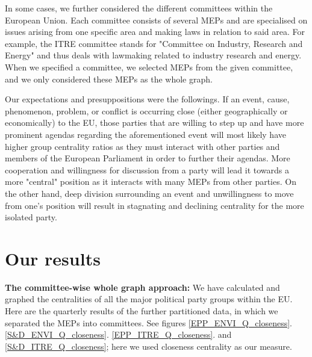\documentclass[lettersize,journal]{IEEEtran}
\begin{document}
In some cases, we further considered the different committees within the European Union. Each committee consists of several MEPs and are specialised on issues arising from one specific area and making laws in relation to said area. For example, the ITRE committee stands for "Committee on Industry, Research and Energy" and thus deals with lawmaking related to industry research and energy. When we specified a committee, we selected MEPs from the given committee, and we only considered these MEPs as the whole graph.

Our expectations and presuppositions were the followings. If an event, cause, phenomenon, problem, or conflict is occurring close (either geographically or economically) to  the EU, those parties that are willing to step up and have more prominent agendas regarding the aforementioned event will most likely have higher group centrality ratios as they must interact with other parties and members of the European Parliament in order to further their agendas. More cooperation and willingness for discussion from a party will lead it towards a more "central" position as it interacts with many MEPs from other parties. On the other hand, deep division surrounding an event and unwillingness to move from one's position will result in stagnating and declining centrality for the more isolated party.

\section{Our results} \label{sec:results}
\textbf{The committee-wise whole graph approach:} We have calculated and graphed the centralities of all the major political party groups within the EU. Here are the quarterly results of the further partitioned data, in which we separated the MEPs into committees. See figures \ref{EPP_ENVI_Q_closeness}. \ref{S&D_ENVI_Q_closeness}. \ref{EPP_ITRE_Q_closeness}. and \ref{S&D_ITRE_Q_closeness}; here we used closeness centrality as our measure. 
\end{document}
